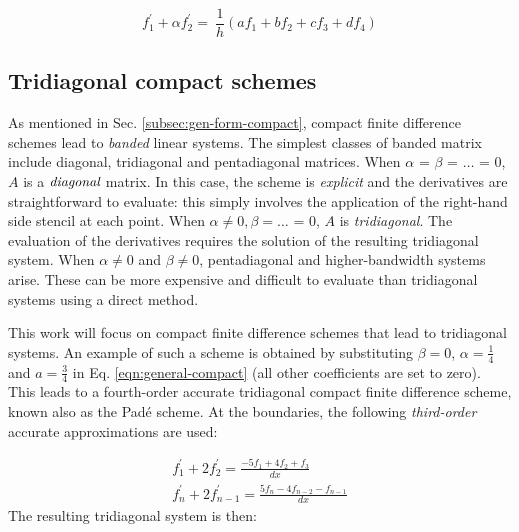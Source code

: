 \begin{equation}
    f_1^{\prime} + \alpha f_2^{\prime} = \
        \frac{1}{h}(af_1 + bf_2 + cf_3 + df_4)
\label{eqn:boundary-compact}
\end{equation}

\subsection{Tridiagonal compact schemes}
\label{sec:tridiagonal-compact-schemes}

As mentioned in Sec. \ref{subsec:gen-form-compact},
compact finite difference schemes lead to
\emph{banded} linear systems.
The simplest classes of banded matrix include
diagonal, tridiagonal and pentadiagonal matrices.
When $\alpha$ = $\beta$ = $\hdots$ = 0,
$A$ is a $\emph{diagonal}$ matrix.
In this case, the
scheme is \emph{explicit}
and the derivatives are straightforward to evaluate:
this simply involves the
application of the right-hand side stencil at each point.
When $\alpha \neq 0, \beta = \hdots$ = 0,
$A$ is \emph{tridiagonal}.
The evaluation of the derivatives requires
the solution of the resulting tridiagonal system.
When $\alpha \neq 0$ and $\beta \neq  0$,
pentadiagonal and higher-bandwidth systems arise.
These can be more expensive and difficult to evaluate
than tridiagonal systems
using a direct method.

This work will focus on
compact finite difference schemes that lead
to tridiagonal systems.
An example of such a scheme is obtained
by substituting 
$\beta = 0$, $\alpha = \frac{1}{4}$ and $a = \frac{3}{4}$
in Eq. \ref{eqn:general-compact}
(all other coefficients are set to zero).
This leads to a fourth-order accurate
tridiagonal compact finite difference scheme,
known also as the Pad\'{e} scheme.
At the boundaries,
the following \emph{third-order} accurate
approximations are used:

\begin{align}
    f^{\prime}_1 + 2f^{\prime}_2 = \frac{-5f_1 + 4f_2 + f_3}{dx} \\
    f^{\prime}_{n} + 2f^{\prime}_{n-1}
    =
    \frac{5f_{n} - 4f_{n-2} -  f_{n-1}}{dx}
\end{align}
%
The resulting tridiagonal system is then:


